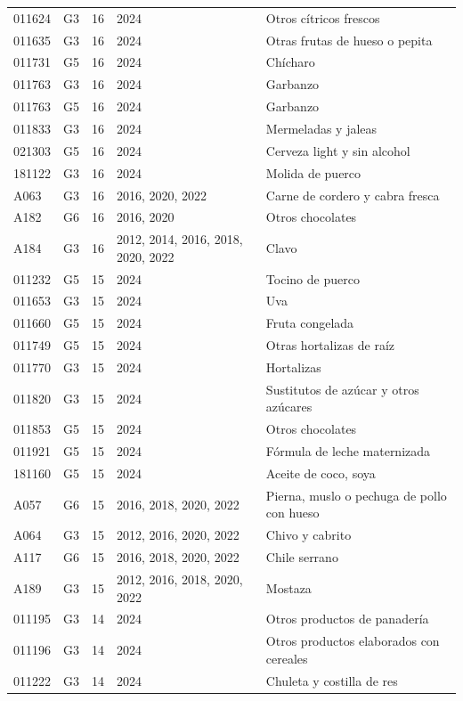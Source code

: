 \begin{table}[ht]
\begin{tabular}{llrll}
  011624 & G3 &  16 & 2024 & Otros cítricos frescos \\ 
  011635 & G3 &  16 & 2024 & Otras frutas de hueso o pepita \\ 
  011731 & G5 &  16 & 2024 & Chícharo \\ 
  011763 & G3 &  16 & 2024 & Garbanzo \\ 
  011763 & G5 &  16 & 2024 & Garbanzo \\ 
  011833 & G3 &  16 & 2024 & Mermeladas y jaleas \\ 
  021303 & G5 &  16 & 2024 & Cerveza light y sin alcohol \\ 
  181122 & G3 &  16 & 2024 & Molida de puerco \\ 
  A063 & G3 &  16 & 2016, 2020, 2022 & Carne de cordero y cabra fresca \\ 
  A182 & G6 &  16 & 2016, 2020 & Otros chocolates \\ 
  A184 & G3 &  16 & 2012, 2014, 2016, 2018, 2020, 2022 & Clavo \\ 
  011232 & G5 &  15 & 2024 & Tocino de puerco \\ 
  011653 & G3 &  15 & 2024 & Uva \\ 
  011660 & G5 &  15 & 2024 & Fruta congelada \\ 
  011749 & G5 &  15 & 2024 & Otras hortalizas de raíz \\ 
  011770 & G3 &  15 & 2024 & Hortalizas \\ 
  011820 & G3 &  15 & 2024 & Sustitutos de azúcar y otros azúcares \\ 
  011853 & G5 &  15 & 2024 & Otros chocolates \\ 
  011921 & G5 &  15 & 2024 & Fórmula de leche maternizada \\ 
  181160 & G5 &  15 & 2024 & Aceite de coco, soya \\ 
  A057 & G6 &  15 & 2016, 2018, 2020, 2022 & Pierna, muslo o pechuga de pollo con hueso \\ 
  A064 & G3 &  15 & 2012, 2016, 2020, 2022 & Chivo y cabrito \\ 
  A117 & G6 &  15 & 2016, 2018, 2020, 2022 & Chile serrano \\ 
  A189 & G3 &  15 & 2012, 2016, 2018, 2020, 2022 & Mostaza \\ 
  011195 & G3 &  14 & 2024 & Otros productos de panadería \\ 
  011196 & G3 &  14 & 2024 & Otros productos elaborados con cereales \\ 
  011222 & G3 &  14 & 2024 & Chuleta y costilla de res \\ 

\end{tabular}
\end{table}
